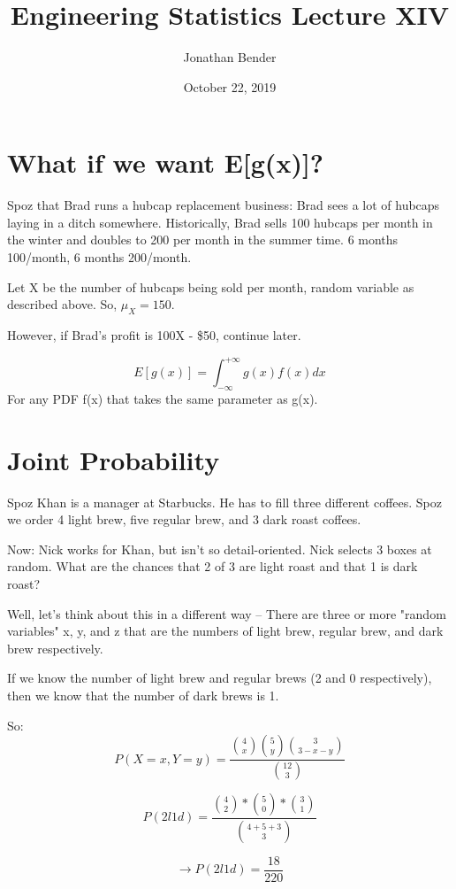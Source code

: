 \documentclass[]{article}
\title{Engineering Statistics Lecture XIV}
\author{Jonathan Bender}
\date{October 22, 2019}
\begin{document}
	
	\maketitle
	
	\section{What if we want E[g(x)]?}
		Spoz that Brad runs a hubcap replacement business: Brad sees a lot of hubcaps laying in a ditch somewhere. Historically, Brad sells 100 hubcaps per month in the winter and doubles to 200 per month in the summer time. 6 months 100/month, 6 months 200/month.
		
		Let X be the number of hubcaps being sold per month, random variable as described above. So, $\mu_X = 150$.
		
		However, if Brad's profit is 100X - \$50, continue later.
	
		\begin{equation}
			E[g(x)] = \int_{-\infty}^{+\infty}g(x)f(x)dx
		\end{equation}
		For any PDF f(x) that takes the same parameter as g(x).
		
	\section{Joint Probability}
		Spoz Khan is a manager at Starbucks. He has to fill three different coffees. Spoz we order 4 light brew, five regular brew, and 3 dark roast coffees.
		
		Now: Nick works for Khan, but isn't so detail-oriented. Nick selects 3 boxes at random. What are the chances that 2 of 3 are light roast and that 1 is dark roast?
		
		Well, let's think about this in a different way -- There are three or more "random variables" x, y, and z that are the numbers of light brew, regular brew, and dark brew respectively.
		
		If we know the number of light brew and regular brews (2 and 0 respectively), then we know that the number of dark brews is 1.
		
		So: $$P(X = x, Y = y) = \dfrac{\binom{4}{x}\binom{5}{y}\binom{3}{3-x-y}}{\binom{12}{3}}$$
		
		$$ P(2l1d) = \dfrac{\binom{4}{2} * \binom{5}{0} * \binom{3}{1} }{\binom{4 + 5 + 3}{3}}$$
		
		$$\to P(2l1d) = \dfrac{18}{220}$$
	
	
\end{document}

